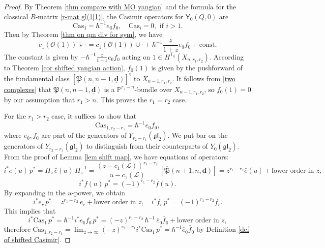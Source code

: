\documentclass[10pt]{amsart}
\theoremstyle{definition}
\numberwithin{equation}{section}
\newcommand{\bP}{\mathbb{P}}
\newcommand{\bd}{\mathbf{d}}
\newcommand{\sT}{\mathsf{T}}
\begin{document}
\begin{proof}
By Theorem \ref{thm compare with MO yangian} and the formula for the classical $R$-matrix \eqref{r-mat gl(1|1)}, the Casimir operators for $\mathsf Y_0(Q,0)$ are $$\mathrm{Cas}_{1}=\hbar^{-1}e_0f_0, \quad \mathrm{Cas}_{i}=0, \,\, \mathrm{if}\, \, i>1.$$ 
Then by Theorem \ref{thm on qm div for sym}, we have 
$$c_1(\mathcal O(1))\,\widetilde{\star}\,\cdot=c_1(\mathcal O(1))\cup \cdot + \hbar^{-1}\frac{z}{1+z}e_0f_0+\mathrm{const}. $$ 
The constant is given by $-\hbar^{-1}\frac{z}{1+z}e_0f_0$ acting on $1\in H^{\sT_0}(X_{n,r_1,r_2})$. According to Theorem \ref{cor shifted yangian action}, $f_0(1)$ is given by the pushforward of the fundamental class $[\overline{\mathfrak{P}}(n,n-1,\underline{\bd})]^{\mathrm{t}}$ to $X_{n-1,r_1,r_2}$. It follows from \eqref{two complexes} that $\overline{\mathfrak{P}}(n,n-1,\underline{\bd})$ is a $\bP^{r_1-n}$-bundle over $X_{n-1,r_1,r_2}$, so $f_0(1)=0$ by our assumption that $r_1>n$. This proves the $r_1=r_2$ case.

For the $r_1>r_2$ case, it suffices to show that 
$$\mathrm{Cas}_{1,r_2-r_1}= \hbar^{-1}e_0f_0, $$ 
where $e_0,f_0$ are part of the generators of $Y_{r_2-r_1}(\mathfrak{gl}_2)$. We put bar on the generators of $Y_{r_2-r_1}(\mathfrak{gl}_2)$ to distinguish from their counterparts of $Y_{0}(\mathfrak{gl}_2)$. From the proof of Lemma \ref{lem shift map}, we have equations of operators: 
$$ i^*e(u)\,p^{*}=H_{z}\,\bar e(u)\,H_{z}^{-1}=\frac{(z-c_1(\mathcal L))^{r_1-r_2}}{u-c_1(\mathcal L)}\,[\overline{\mathfrak{P}}(n+1,n,\underline{\bd})]
=z^{r_1-r_2}\bar e(u)+\text{lower order in $z$}, $$
$$i^*f(u)\,p^{*}=(-1)^{r_1-r_2}\bar f(u).$$
By expanding in the $u$-power, we obtain 
$$i^*e_r\,p^{*}=z^{r_1-r_2}\, \bar e_r+\text{lower order in $z$}, \quad i^*f_r\,p^{*}=(-1)^{r_1-r_2}\bar f_r. $$ 
This implies that 
\begin{equation*}
i^*\mathrm{Cas}_1\,p^{*}=\hbar^{-1}i^*e_0f_0\,p^{*}=(-z)^{r_1-r_2}\,\hbar^{-1}\, \bar e_0\bar f_0+\text{lower order in $z$},
\end{equation*}
therefore $\mathrm{Cas}_{1,r_2-r_1}=\lim_{z\to \infty}(-z)^{r_2-r_1}i^*\mathrm{Cas}_1\,p^{*}=\hbar^{-1}\bar e_0\bar f_0$ by Definition \ref{def of shifted Casimir}.
\end{proof}
\end{document}
